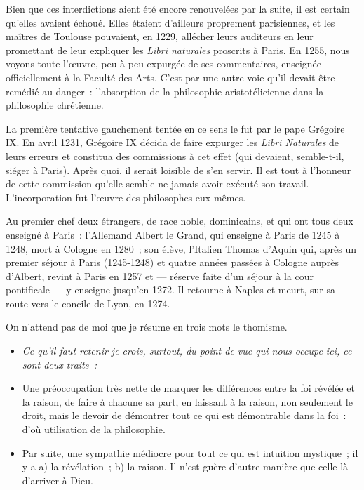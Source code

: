\documentclass[french,twoside]{book} %
\newlength{\listmod}
\newcommand{\listhead}[1]{\hspace{-1\listmod}\emph{#1}}
\begin{document}
\noindent Bien que ces interdictions aient été encore renouvelées par la suite, il est certain qu’elles avaient échoué. Elles étaient d’ailleurs proprement parisiennes, et les maîtres de Toulouse pouvaient, en 1229, allécher leurs auditeurs en leur promettant de leur expliquer les {\itshape Libri naturales} proscrits à Paris. En 1255, nous voyons toute l’œuvre, peu à peu expurgée de ses commentaires, enseignée officiellement à la Faculté des Arts. C’est par une autre voie qu’il devait être remédié au danger : l’absorption de la philosophie aristotélicienne dans la philosophie chrétienne.\par
La première tentative gauchement tentée en ce sens le fut par le pape Grégoire IX. En avril 1231, Grégoire IX décida de faire expurger les {\itshape Libri Naturales} de leurs erreurs et constitua des commissions à cet effet (qui devaient, semble-t-il, siéger à Paris). Après quoi, il serait loisible de s’en servir. Il est tout à l’honneur de cette commission qu’elle semble ne jamais avoir exécuté son travail. L’incorporation fut l’œuvre des philosophes eux-mêmes.\par
Au premier chef deux étrangers, de race noble, dominicains, et qui ont tous deux enseigné à Paris : l’Allemand Albert le Grand, qui enseigne à Paris de 1245 à 1248, mort à Cologne en 1280 ; son élève, l’Italien Thomas d’Aquin qui, après un premier séjour à Paris (1245-1248) et quatre années passées à Cologne auprès d’Albert, revint à Paris en 1257 et — réserve faite d’un séjour à la cour pontificale — y enseigne jusqu’en 1272. Il retourne à Naples et meurt, sur sa route vers le concile de Lyon, en 1274.\par
On n’attend pas de moi que je résume en trois mots le thomisme.\par

\begin{itemize}[itemsep=0pt,]
\item[]\listhead{Ce qu’il faut retenir je crois, surtout, du point de vue qui nous occupe ici, ce sont deux traits :}
\item Une préoccupation très nette de marquer les différences entre la foi révélée et la raison, de faire à chacune sa part, en laissant à la raison, non seulement le droit, mais le devoir de démontrer tout ce qui est démontrable dans la foi : d’où utilisation de la philosophie.
\item Par suite, une sympathie médiocre pour tout ce qui est intuition mystique ; il y a a) la révélation ; b) la raison. Il n’est guère d’autre manière que celle-là d’arriver à Dieu.
\end{itemize}
\end{document}
